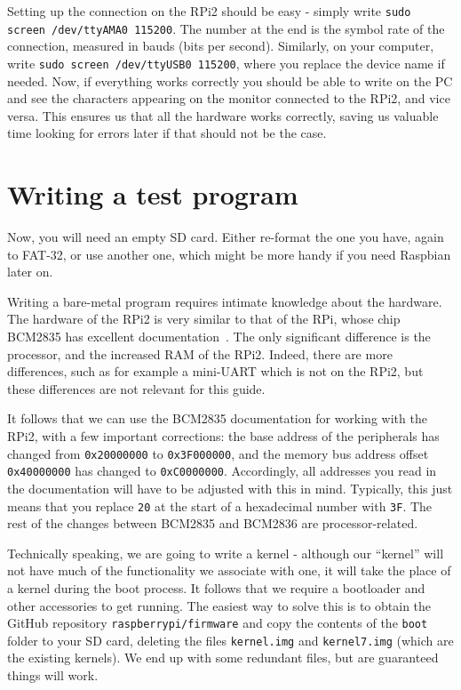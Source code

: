 \documentclass[a4paper,11pt,reqno]{amsart}
\begin{document}
Setting up the connection on the RPi2 should be easy - simply write \texttt{sudo screen /dev/ttyAMA0 115200}. The number at the end is the symbol rate of the connection, measured in bauds (bits per second). Similarly, on your computer, write \texttt{sudo screen /dev/ttyUSB0 115200}, where you replace the device name if needed. Now, if everything works correctly you should be able to write on the PC and see the characters appearing on the monitor connected to the RPi2, and vice versa. This ensures us that all the hardware works correctly, saving us valuable time looking for errors later if that should not be the case.

\section{Writing a test program}
Now, you will need an empty SD card. Either re-format the one you have, again to FAT-32, or use another one, which might be more handy if you need Raspbian later on.

Writing a bare-metal program requires intimate knowledge about the hardware. The hardware of the RPi2 is very similar to that of the RPi, whose chip BCM2835 has excellent documentation~\cite{bcm2835}. The only significant difference is the processor, and the increased RAM of the RPi2. Indeed, there are more differences, such as for example a mini-UART which is not on the RPi2, but these differences are not relevant for this guide.

It follows that we can use the BCM2835 documentation for working with the RPi2, with a few important corrections: the base address of the peripherals has changed from \texttt{0x20000000} to \texttt{0x3F000000}, and the memory bus address offset \texttt{0x40000000} has changed to \texttt{0xC0000000}. Accordingly, all addresses you read in the documentation will have to be adjusted with this in mind. Typically, this just means that you replace \texttt{20} at the start of a hexadecimal number with \texttt{3F}. The rest of the changes between BCM2835 and BCM2836 are processor-related.

Technically speaking, we are going to write a kernel - although our ``kernel'' will not have much of the functionality we associate with one, it will take the place of a kernel during the boot process. It follows that we require a bootloader and other accessories to get running. The easiest way to solve this is to obtain the GitHub repository \texttt{raspberrypi/firmware} and copy the contents of the \texttt{boot} folder to your SD card, deleting the files \texttt{kernel.img} and \texttt{kernel7.img} (which are the existing kernels). We end up with some redundant files, but are guaranteed things will work.
\end{document}
